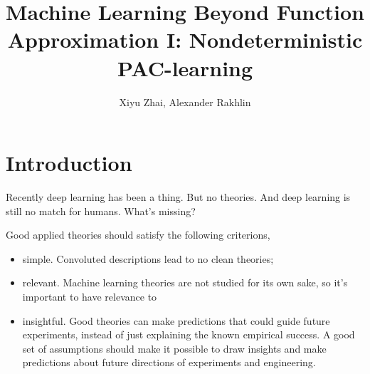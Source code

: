 \documentclass[11pt, oneside]{article}   	%
\title{Machine Learning Beyond Function Approximation I: Nondeterministic PAC-learning}
\author{Xiyu Zhai, Alexander Rakhlin}
\date{}							%
\theoremstyle{definition}
\begin{document}
\maketitle
\tableofcontents

\section{Introduction}

Recently deep learning has been a thing. But no theories. And deep learning is still no match for humans. What's missing?

Good applied theories should satisfy the following criterions,
\begin{itemize}
	\item simple. Convoluted descriptions lead to no clean theories;
	\item relevant. Machine learning theories are not studied for its own sake, so it's important to have relevance to
	\item insightful. Good theories can make predictions that could guide future experiments, instead of just explaining the known empirical success. A good set of assumptions should make it possible to draw insights and make predictions about future directions of experiments and engineering.
\end{itemize}
\end{document}
